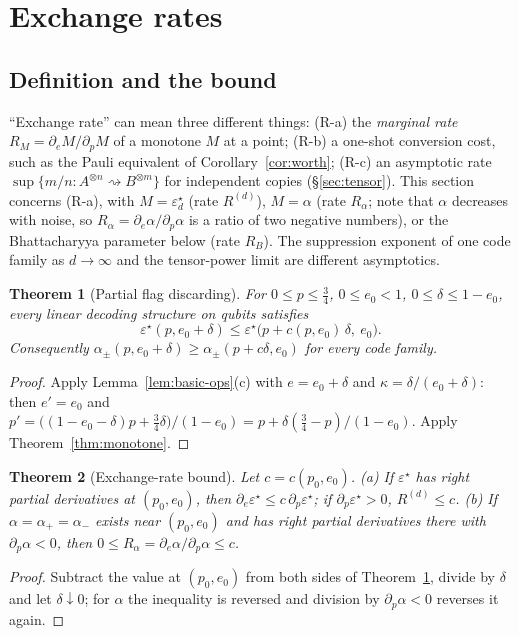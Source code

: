 \documentclass[11pt,a4paper]{article}
\theoremstyle{plain}
\newtheorem{theorem}{Theorem}[section]
\theoremstyle{definition}
\theoremstyle{remark}
\newcommand{\err}{\varepsilon^{\star}}
\newcommand{\red}{\rightsquigarrow}
\begin{document}
\section{Exchange rates}\label{sec:rates}

\subsection{Definition and the bound}

``Exchange rate'' can mean three different things: (R-a) the \emph{marginal rate} $R_M=\partial_eM/\partial_pM$ of a monotone $M$ at a point; (R-b) a one-shot conversion cost, such as the Pauli equivalent of Corollary~\ref{cor:worth}; (R-c) an asymptotic rate $\sup\{m/n:A^{\otimes n}\red B^{\otimes m}\}$ for independent copies (\S\ref{sec:tensor}). This section concerns (R-a), with $M=\err_d$ (rate $R^{(d)}$), $M=\alpha$ (rate $R_\alpha$; note that $\alpha$ decreases with noise, so $R_\alpha=\partial_e\alpha/\partial_p\alpha$ is a ratio of two negative numbers), or the Bhattacharyya parameter below (rate $R_B$). The suppression exponent of one code family as $d\to\infty$ and the tensor-power limit are different asymptotics.

\begin{theorem}[Partial flag discarding]\label{thm:partial}
For $0\le p\le\tfrac34$, $0\le e_0<1$, $0\le\delta\le1-e_0$, every linear decoding structure on qubits satisfies
\[
\err(p,e_0+\delta)\le\err\big(p+c(p,e_0)\,\delta,\ e_0\big).
\]
Consequently $\alpha_\pm(p,e_0+\delta)\ge\alpha_\pm(p+c\delta,e_0)$ for every code family.
\end{theorem}
\begin{proof}
Apply Lemma~\ref{lem:basic-ops}(c) with $e=e_0+\delta$ and $\kappa=\delta/(e_0+\delta)$: then $e'=e_0$ and $p'=\big((1-e_0-\delta)p+\tfrac34\delta\big)/(1-e_0)=p+\delta(\tfrac34-p)/(1-e_0)$. Apply Theorem~\ref{thm:monotone}.
\end{proof}

\begin{theorem}[Exchange-rate bound]\label{thm:rate}
Let $c=c(p_0,e_0)$.
(a) If $\err$ has right partial derivatives at $(p_0,e_0)$, then $\partial_e\err\le c\,\partial_p\err$; if $\partial_p\err>0$, $R^{(d)}\le c$.
(b) If $\alpha=\alpha_+=\alpha_-$ exists near $(p_0,e_0)$ and has right partial derivatives there with $\partial_p\alpha<0$, then $0\le R_\alpha=\partial_e\alpha/\partial_p\alpha\le c$.
\end{theorem}
\begin{proof}
Subtract the value at $(p_0,e_0)$ from both sides of Theorem~\ref{thm:partial}, divide by $\delta$ and let $\delta\downarrow0$; for $\alpha$ the inequality is reversed and division by $\partial_p\alpha<0$ reverses it again.
\end{proof}
\end{document}
